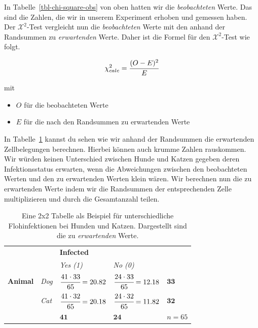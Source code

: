 \documentclass[
  letterpaper,
]{scrbook}
\providecommand{\tightlist}{%
  \setlength{\itemsep}{0pt}\setlength{\parskip}{0pt}}\usepackage{longtable,booktabs,array}
\begin{document}
In Tabelle~\ref{tbl-chi-square-obs} von oben hatten wir die
\emph{beobachteten} Werte. Das sind die Zahlen, die wir in unserem
Experiment erhoben und gemessen haben. Der \(\mathcal{X}^2\)-Test
vergleicht nun die \emph{beobachteten} Werte mit den anhand der
Randsummen zu \emph{erwartenden} Werte. Daher ist die Formel für den
\(\mathcal{X}^2\)-Test wie folgt.

\[
\chi^2_{calc} = \cfrac{(O - E)^2}{E}
\]

mit

\begin{itemize}
\tightlist
\item
  \(O\) für die beobachteten Werte
\item
  \(E\) für die nach den Randsummen zu erwartenden Werte
\end{itemize}

In Tabelle~\ref{tbl-chi-square-exp} kannst du sehen wie wir anhand der
Randsummen die erwartenden Zellbelegungen berechnen. Hierbei können auch
krumme Zahlen rauskommen. Wir würden keinen Unterschied zwischen Hunde
und Katzen gegeben deren Infektionsstatus erwarten, wenn die
Abweichungen zwischen den beobachteten Werten und den zu erwartenden
Werten klein wären. Wir berechnen nun die zu erwartenden Werte indem wir
die Randsummen der entsprechenden Zelle multiplizieren und durch die
Gesamtanzahl teilen.

\hypertarget{tbl-chi-square-exp}{}
\begin{longtable}[]{@{}
  >{\centering\arraybackslash}p{}
  >{\centering\arraybackslash}p{}
  >{\centering\arraybackslash}p{}
  >{\centering\arraybackslash}p{}
  >{\centering\arraybackslash}p{}@{}}
\caption{\label{tbl-chi-square-exp}Eine 2x2 Tabelle als Beispiel für
unterschiedliche Flohinfektionen bei Hunden und Katzen. Dargestellt sind
die zu \emph{erwartenden} Werte.}\tabularnewline
\toprule()
\endhead
& & \textbf{Infected} & & \\
& & \emph{Yes (1)} & \emph{No (0)} & \\
\textbf{Animal} & \emph{Dog} & \(\cfrac{41 \cdot 33}{65} = 20.82\) &
\(\cfrac{24 \cdot 33}{65} = 12.18\) & \(\mathbf{33}\) \\
& \emph{Cat} & \(\cfrac{41 \cdot 32}{65} = 20.18\) &
\(\cfrac{24 \cdot 32}{65} = 11.82\) & \(\mathbf{32}\) \\
& & \(\mathbf{41}\) & \(\mathbf{24}\) & \(n = 65\) \\
\bottomrule()
\end{longtable}
\end{document}

